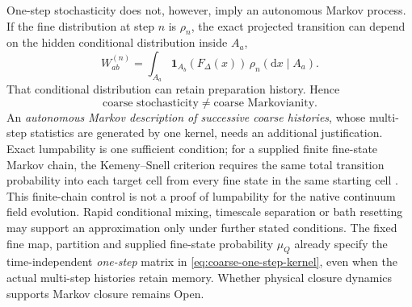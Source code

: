 \documentclass[11pt]{article}
\theoremstyle{definition}
\newcommand{\dd}{\mathrm{d}}
\begin{document}
One-step stochasticity does not, however, imply an autonomous Markov process.  If the fine
distribution at step $n$ is $\rho_n$, the exact projected transition can depend on the hidden
conditional distribution inside $A_a$,
\begin{equation}
  W_{ab}^{(n)}
  =\int_{A_a}\mathbf 1_{A_b}\!\left(F_\Delta(x)\right)\,\rho_n(\dd x\mid A_a).
  \label{eq:history-dependent-coarse-kernel}
\end{equation}
That conditional distribution can retain preparation history.  Hence
\begin{equation}
  \boxed{
  \text{coarse stochasticity}\neq\text{coarse Markovianity}.}
  \label{eq:stochastic-not-markov}
\end{equation}
An \emph{autonomous Markov description of successive coarse histories},
whose multi-step statistics are generated by one kernel, needs an additional
justification. Exact lumpability is one sufficient condition; for a supplied
finite fine-state Markov chain, the Kemeny--Snell criterion requires the same
total transition probability into each target cell from every fine state in
the same starting cell \cite{KemenySnell1960}. This finite-chain control is
not a proof of lumpability for the native continuum field evolution. Rapid
conditional mixing, timescale separation or bath resetting may support an
approximation only under further stated conditions. The fixed fine map,
partition and supplied fine-state probability $\mu_Q$ already specify the time-independent
\emph{one-step} matrix in \cref{eq:coarse-one-step-kernel}, even when the
actual multi-step histories retain memory. Whether physical closure
dynamics supports Markov closure remains Open.
\end{document}
